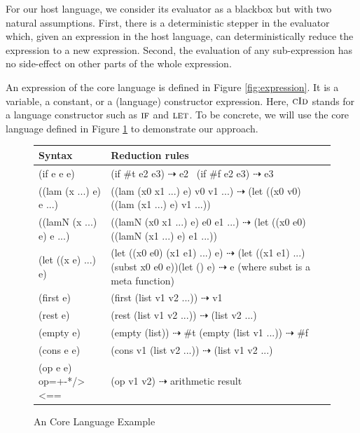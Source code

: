 For our host language, we consider its evaluator as a blackbox but with two natural assumptions. First, there is a deterministic stepper in the evaluator which, given an expression in the host language, can deterministically reduce the expression to a new expression. Second, the evaluation of any sub-expression has no side-effect on other parts of the whole expression.

An expression of the core language is defined in Figure \ref{fig:expression}. It is a variable, a constant, or a (language) constructor expression. Here, $\mbox{\sc cId}$ stands for a language constructor such as $\mbox{\sc if}$ and $\mbox{\sc let}$. To be concrete, we will use the core language defined in Figure \ref{fig:core} to demonstrate our approach.

\begin{figure}[t]
\begin{center}
\begin{tabularx}{.9\textwidth}%
{|>{\setlength{\hsize}{.4\hsize}\centering\arraybackslash}X  |>{\setlength{\hsize}{1.6\hsize}\centering\arraybackslash}X|}
\hline
Syntax & Reduction rules \\ \hline
(if e e e) &\qquad\qquad\qquad(if \#t e2 e3) $\dashrightarrow$ e2 \newline ~(if \#f e2 e3) $\dashrightarrow$ e3\\ \hline
((lam (x ...) e) e ...) & ((lam (x0 x1 ...) e) v0 v1 ...) $\dashrightarrow$ (let ((x0 v0) ((lam (x1 ...) e) v1 ...))\\ \hline
((lamN (x ...) e) e ...) & ((lamN (x0 x1 ...) e) e0 e1 ...) $\dashrightarrow$ (let ((x0 e0) ((lamN (x1 ...) e) e1 ...))\\ \hline
(let ((x e) ...) e) & (let ((x0 e0) (x1 e1) ...) e) $\dashrightarrow$ (let ((x1 e1) ...) (subst x0 e0 e))\newline (let () e)  $\dashrightarrow$ e (where subst is a meta function)\\ \hline
(first e) & (first (list v1 v2 ...)) $\dashrightarrow$ v1\\ \hline
(rest e) & (rest (list v1 v2 ...)) $\dashrightarrow$ (list v2 ...)\\ \hline
(empty e) & \qquad\qquad\qquad(empty (list)) $\dashrightarrow$ \#t \newline (empty (list v1 ...)) $\dashrightarrow$ \#f\\ \hline
(cons e e) & (cons v1 (list v2 ...)) $\dashrightarrow$ (list v1 v2 ...)\\ \hline
(op e e) \newline op=+-*/><== & (op v1 v2) $\dashrightarrow$ arithmetic result\\ \hline
\end{tabularx}
\end{center}
\caption{An Core Language Example}
\label{fig:core}
\end{figure}


